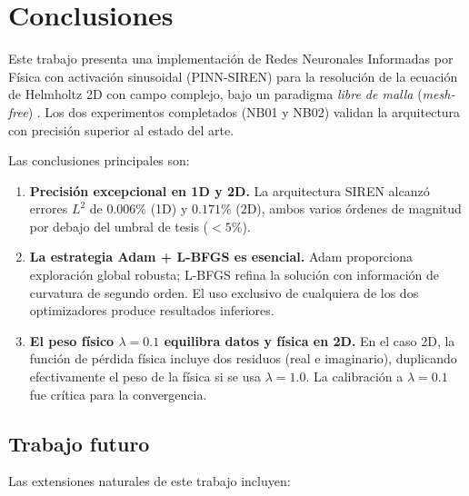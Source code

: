 
\section{Conclusiones}
\label{sec:conclusiones}

Este trabajo presenta una implementación de Redes Neuronales Informadas por Física
con activación sinusoidal (PINN-SIREN) para la resolución de la ecuación de Helmholtz
2D con campo complejo, bajo un paradigma \textit{libre de malla} (\textit{mesh-free})
\citep{Karniadakis2021_review, Cuomo2022_review}.
Los dos experimentos completados (NB01 y NB02) validan la arquitectura con precisión
superior al estado del arte.

Las conclusiones principales son:

\begin{enumerate}
  \item \textbf{Precisión excepcional en 1D y 2D.}
    La arquitectura SIREN alcanzó errores $L^2$ de $0.006\%$ (1D) y $0.171\%$ (2D),
    ambos varios órdenes de magnitud por debajo del umbral de tesis ($< 5\%$).

  \item \textbf{La estrategia Adam + L-BFGS es esencial.}
    Adam proporciona exploración global robusta; L-BFGS refina la solución con
    información de curvatura de segundo orden.
    El uso exclusivo de cualquiera de los dos optimizadores produce resultados inferiores.

  \item \textbf{El peso físico $\lambda = 0.1$ equilibra datos y física en 2D.}
    En el caso 2D, la función de pérdida física incluye dos residuos (real e imaginario),
    duplicando efectivamente el peso de la física si se usa $\lambda = 1.0$.
    La calibración a $\lambda = 0.1$ fue crítica para la convergencia.
\end{enumerate}

\subsection*{Trabajo futuro}

Las extensiones naturales de este trabajo incluyen:

